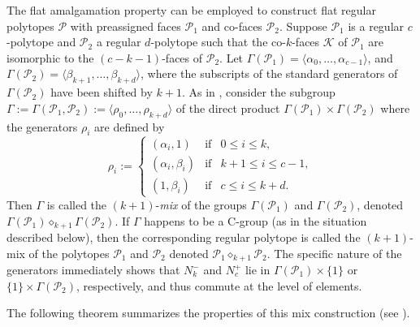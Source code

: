 \documentclass[10pt,a4paper]{amsart}
\theoremstyle{definition}
\begin{document}
The flat amalgamation property can be employed to construct flat regular polytopes $\mathcal{P}$ with preassigned faces $\mathcal{P}_{1}$ and co-faces $\mathcal{P}_{2}$.
Suppose $\mathcal{P}_{1}$ is a regular $c$-polytope and $\mathcal{P}_{2}$ a regular $d$-polytope such that the co-$k$-faces $\mathcal{K}$ of $\mathcal{P}_{1}$ are isomorphic to the $(c-k-1)$-faces of $\mathcal{P}_{2}$. Let $\Gamma(\mathcal{P}_{1}) = \langle\alpha_{0},\ldots,\alpha_{c-1}\rangle$, and $\Gamma(\mathcal{P}_{2}) = \langle\beta_{k+1},\ldots,\beta_{k+d}\rangle$, where the subscripts of the standard generators of $\Gamma(\mathcal{P}_{2})$ have been shifted by $k+1$. As in \cite[4F5]{McMSch2002}, consider the subgroup 
$\Gamma := \Gamma(\mathcal{P}_{1},\mathcal{P}_{2}) := \langle\rho_0,\ldots,\rho_{k+d}\rangle$ of the direct product $\Gamma(\mathcal{P}_{1}) \times \Gamma(\mathcal{P}_{2})$ where the generators $\rho_i$ are defined by
\begin{equation}
\label{flatamalgen}
\rho_{i} := \left\{  
\begin{array}{lcl}
(\alpha_{i},1) & \mbox{if} & 0 \leq i \leq k,  \\
(\alpha_{i},\beta_{i}) & \mbox{if} & k+1 \leq i \leq c-1,  \\
(1,\beta_{i}) & \mbox{if} & c \leq i \leq k+d.
\end{array}  \right.
\end{equation}
Then $\Gamma$ is called the $(k+1)$-{\it mix\/} of the groups $\Gamma(\mathcal{P}_{1})$ and $\Gamma(\mathcal{P}_{2})$, denoted $\Gamma(\mathcal{P}_{1})\!\diamond_{k+1}\!\Gamma(\mathcal{P}_{2})$. If $\Gamma$ happens to be a C-group (as in the situation described below), then the corresponding regular polytope is called the $(k+1)$-mix of the polytopes $\mathcal{P}_1$ and $\mathcal{P}_2$ denoted $\mathcal{P}_{1}\!\diamond_{k+1}\!\mathcal{P}_{2}$.
The specific nature of the generators immediately shows that $N_{k}^{-}$ and $N_{c}^{+}$ lie in $\Gamma(\mathcal{P}_{1})\times\{1\}$ or $\{1\}\times\Gamma(\mathcal{P}_{2})$, respectively, and thus commute at the level of elements.

The following theorem summarizes the properties of this mix construction (see \cite[Thm. 4F9]{McMSch2002}). 
\end{document}
